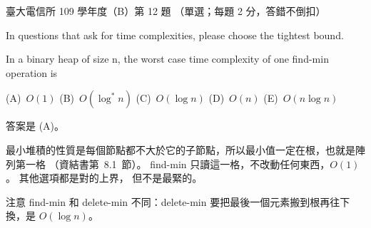 \begin{pastexam}[label={px:ntu-109-comm-dsa-12}]{臺大電信所 109 學年度（B）第 12 題}
（單選；每題 2 分，答錯不倒扣）

In questions that ask for time complexities, please choose the tightest bound.

In a binary heap of size n, the worst case time complexity of one find-min operation is

(A)~$O(1)$ \qquad (B)~$O(\log^* n)$ \qquad (C)~$O(\log n)$ \qquad (D)~$O(n)$ \qquad (E)~$O(n\log n)$
\end{pastexam}

\begin{pastsoln}
答案是 (A)。

最小堆積的性質是每個節點都不大於它的子節點，所以最小值一定在根，也就是陣列第一格
（資結書第~8.1~節）。 find-min 只讀這一格，不改動任何東西，$O(1)$。 其他選項都是對的上界，
但不是最緊的。

注意 find-min 和 delete-min 不同：delete-min 要把最後一個元素搬到根再往下換，是
$O(\log n)$。
\end{pastsoln}
